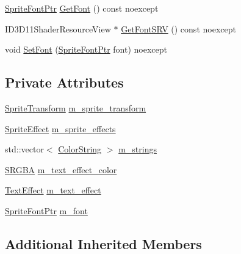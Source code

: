 \begin{DoxyCompactItemize}
\item 
\hyperlink{namespacemage_1_1rendering_ab2f34196c20422ca3692ad3f3bff3a5d}{Sprite\+Font\+Ptr} \hyperlink{classmage_1_1rendering_1_1_sprite_text_a4ec33c106762e7f8d4d04cde0bf03669}{Get\+Font} () const noexcept
\item 
I\+D3\+D11\+Shader\+Resource\+View $\ast$ \hyperlink{classmage_1_1rendering_1_1_sprite_text_af9e6eb6e62d9c638dc86a7a978524aa9}{Get\+Font\+S\+RV} () const noexcept
\item 
void \hyperlink{classmage_1_1rendering_1_1_sprite_text_acad93e0803d47502db5ef16998d2f38a}{Set\+Font} (\hyperlink{namespacemage_1_1rendering_ab2f34196c20422ca3692ad3f3bff3a5d}{Sprite\+Font\+Ptr} font) noexcept
\end{DoxyCompactItemize}
\subsection*{Private Attributes}
\begin{DoxyCompactItemize}
\item 
\hyperlink{classmage_1_1_sprite_transform}{Sprite\+Transform} \hyperlink{classmage_1_1rendering_1_1_sprite_text_af702fbdab6468fbd5856434192a32787}{m\+\_\+sprite\+\_\+transform}
\item 
\hyperlink{namespacemage_1_1rendering_a4dbc3536c87b906f1d41d863ec458e78}{Sprite\+Effect} \hyperlink{classmage_1_1rendering_1_1_sprite_text_a49995d4b435446b48d2d112113834f23}{m\+\_\+sprite\+\_\+effects}
\item 
std\+::vector$<$ \hyperlink{classmage_1_1rendering_1_1_color_string}{Color\+String} $>$ \hyperlink{classmage_1_1rendering_1_1_sprite_text_a2f9d4a00ad08710fe36eebd825b2f142}{m\+\_\+strings}
\item 
\hyperlink{structmage_1_1_s_r_g_b_a}{S\+R\+G\+BA} \hyperlink{classmage_1_1rendering_1_1_sprite_text_afa9c4b4bd748570ce67d8fe57ce86026}{m\+\_\+text\+\_\+effect\+\_\+color}
\item 
\hyperlink{classmage_1_1rendering_1_1_sprite_text_af07ecf28d2ab8997c011cab74e799ef7}{Text\+Effect} \hyperlink{classmage_1_1rendering_1_1_sprite_text_a795a35dc3671097dd29afaa4b2c5ac3a}{m\+\_\+text\+\_\+effect}
\item 
\hyperlink{namespacemage_1_1rendering_ab2f34196c20422ca3692ad3f3bff3a5d}{Sprite\+Font\+Ptr} \hyperlink{classmage_1_1rendering_1_1_sprite_text_ad682901cbe866d2dc316bf3238812d25}{m\+\_\+font}
\end{DoxyCompactItemize}
\subsection*{Additional Inherited Members}


